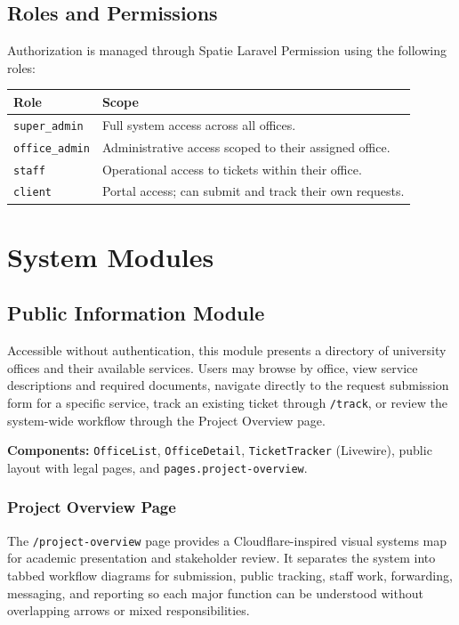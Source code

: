 \documentclass[12pt,a4paper]{article}
\newcommand{\code}[1]{\texttt{#1}}
\begin{document}
\subsection{Roles and Permissions}

Authorization is managed through Spatie Laravel Permission using the following roles:

\begin{table}[h]
\centering
\begin{tabularx}{\textwidth}{@{} l Y @{}}
\toprule
\textbf{Role} & \textbf{Scope} \\
\midrule
\code{super\_admin} & Full system access across all offices. \\
\code{office\_admin} & Administrative access scoped to their assigned office. \\
\code{staff} & Operational access to tickets within their office. \\
\code{client} & Portal access; can submit and track their own requests. \\
\bottomrule
\end{tabularx}
\end{table}

\section{System Modules}

\subsection{Public Information Module}

Accessible without authentication, this module presents a directory of university offices and their available services. Users may browse by office, view service descriptions and required documents, navigate directly to the request submission form for a specific service, track an existing ticket through \code{/track}, or review the system-wide workflow through the Project Overview page.

\textbf{Components:} \code{OfficeList}, \code{OfficeDetail}, \code{TicketTracker} (Livewire), public layout with legal pages, and \code{pages.project-overview}.

\subsubsection{Project Overview Page}

The \code{/project-overview} page provides a Cloudflare-inspired visual systems map for academic presentation and stakeholder review. It separates the system into tabbed workflow diagrams for submission, public tracking, staff work, forwarding, messaging, and reporting so each major function can be understood without overlapping arrows or mixed responsibilities.
\end{document}
